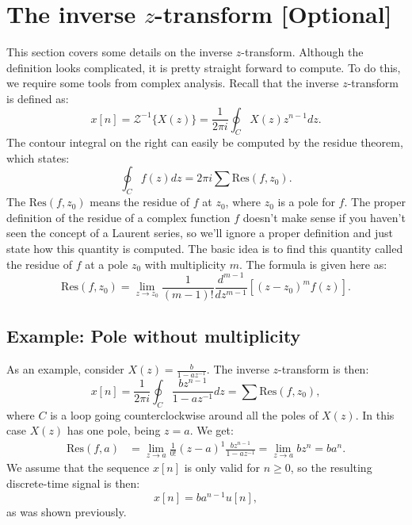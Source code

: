 \section{The inverse $z$-transform [Optional]}
This section covers some details on the inverse $z$-transform. 
Although the definition looks complicated, it is pretty straight forward to compute. To do this, we require 
some tools from complex analysis. Recall that the inverse $z$-transform is defined as:
\begin{equation}
    x[n]=\mathcal{Z}^{-1}\{X(z)\}=\frac{1}{2\pi i}\oint_C X(z)z^{n-1}dz.
\end{equation}
The contour integral on the right can easily be computed by the residue theorem, which states:
\begin{equation}
    \boxed{\oint_C f(z)dz=2\pi i\sum\text{Res}(f,z_{0}).
    }
    \label{residue_thm}
\end{equation}
The $\text{Res}(f,z_{0})$ means the residue of $f$ at $z_{0}$, where $z_{0}$ is a pole for $f$. 
The proper definition of the residue of a complex function $f$ doesn't make sense if you haven't 
seen the concept of a Laurent series, so we'll ignore a proper definition and just state 
how this quantity is computed. The basic idea is to find this quantity called the residue 
of $f$ at a pole $z_{0}$ with multiplicity $m$. The formula is given here as:
\begin{equation}
    \text{Res}(f,z_{0})=\lim_{z\to z_{0}}\frac{1}{(m-1)!}\frac{d^{m-1}}{dz^{m-1}} [(z-z_{0})^{m}f(z)].
    \label{residue}
\end{equation}
\subsection{Example: Pole without multiplicity}
As an example, consider $X(z)=\frac{b}{1-az^{-1}}$. The inverse $z$-transform is then:
$$x[n]=\frac{1}{2\pi i}\oint_{C}\frac{bz^{n-1}}{1-az^{-1}}dz=\sum \text{Res}(f,z_{0}),$$
where $C$ is a loop going counterclockwise around all the poles of $X(z)$. In this case $X(z)$ has one pole, being $z=a$. We get:
\begin{align*}
    \text{Res}(f,a)&=\lim_{z\to a}\frac{1}{0!}(z-a)^{1}\frac{bz^{n-1}}{1-az^{-1}}=\lim_{z\to a}bz^{n}=ba^{n}.
\end{align*}
We assume that the sequence $x[n]$ is only valid for $n\ge 0$, so the resulting discrete-time signal is then: 
\begin{equation}
    x[n]=ba^{n-1}u[n],
\end{equation}
as was shown previously. 

